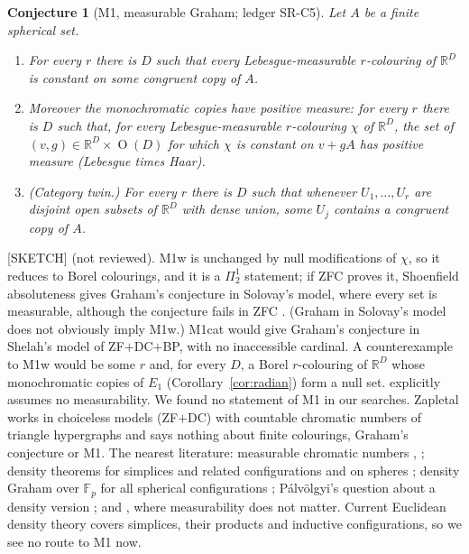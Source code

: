 \documentclass[11pt]{amsart}
\newcommand{\st}[1]{\textsf{[#1]}}
\newcommand{\R}{\mathbb{R}}
\DeclareMathOperator{\Ort}{O}
\theoremstyle{plain}
\newtheorem{conjecture}{Conjecture}
\theoremstyle{definition}
\begin{document}
\begin{conjecture}[M1, measurable Graham; ledger SR-C5]\label{conj:M1}
Let $A$ be a finite spherical set.
\begin{enumerate}
\item[(M1)] For every $r$ there is $D$ such that every Lebesgue-measurable $r$-colouring of $\R^D$ is
constant on some congruent copy of $A$.
\item[(M1w)] Moreover the monochromatic copies have positive measure: for every $r$ there is $D$ such that,
for every Lebesgue-measurable $r$-colouring $\chi$ of $\R^D$, the set of $(v,g)\in\R^D\times\Ort(D)$ for
which $\chi$ is constant on $v+gA$ has positive measure (Lebesgue times Haar).
\item[(M1cat)] (Category twin.) For every $r$ there is $D$ such that whenever $U_1,\dots,U_r$ are disjoint
open subsets of $\R^D$ with dense union, some $U_j$ contains a congruent copy of $A$.
\end{enumerate}
\end{conjecture}

\noindent\st{SKETCH} (not reviewed). M1w is unchanged by null modifications of $\chi$, so it
reduces to Borel colourings, and it is a $\Pi^1_2$ statement; if ZFC proves it, Shoenfield absoluteness
gives Graham's conjecture in Solovay's model, where every set is measurable, although the conjecture fails
in ZFC \cite{Palvolgyi}. (Graham in Solovay's model does not obviously imply M1w.) M1cat would give
Graham's conjecture in Shelah's model of ZF$+$DC$+$BP, with no inaccessible cardinal. A counterexample to
M1w would be some $r$ and, for every $D$, a Borel $r$-colouring of $\R^D$ whose monochromatic copies of
$E_1$ (Corollary~\ref{cor:radian}) form a null set. \cite{OAI172} explicitly assumes no measurability. We
found no statement of M1 in our searches. Zapletal \cite{Zapletal} works in choiceless models
(ZF$+$DC) with countable chromatic numbers of triangle hypergraphs and says nothing about finite
colourings, Graham's conjecture or M1. The nearest literature: measurable chromatic numbers \cite{Falconer},
\cite{ShelahSoifer,Payne}; density theorems for simplices and related configurations
\cite{Bourgain,CastroSilva} and on spheres \cite{GuruswamiLi}; density Graham over $\mathbb F_p$ for all
spherical configurations \cite{Sun}; P\'alv\"olgyi's question about a density version
\cite[\S7]{Palvolgyi-ncs}; and \cite{OAI158}, where measurability does not matter. Current Euclidean density
theory covers simplices, their products and inductive configurations, so we see no route to M1 now.
\end{document}
